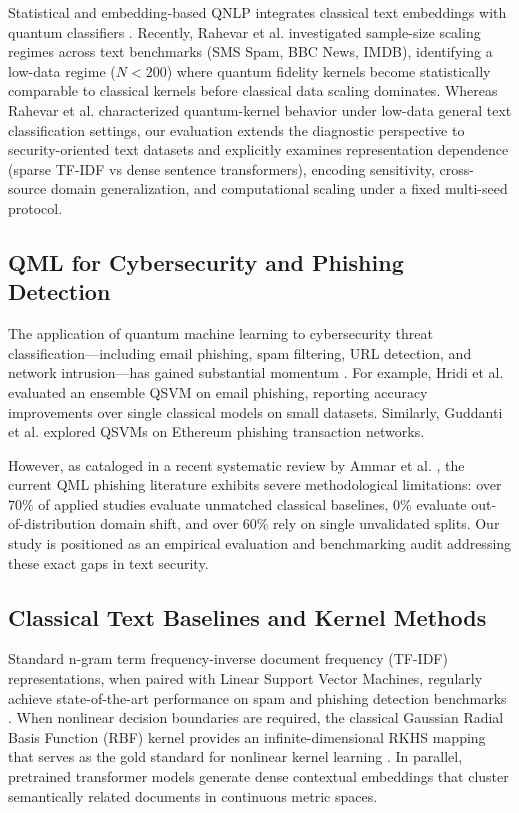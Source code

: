 \documentclass[10pt,twocolumn,letterpaper]{article}
\begin{document}
Statistical and embedding-based QNLP integrates classical text embeddings with quantum classifiers \cite{garg2024quantum,shukla2023quantum,disipio2021hybrid}. Recently, Rahevar et al. \cite{rahevar2026quantum} investigated sample-size scaling regimes across text benchmarks (SMS Spam, BBC News, IMDB), identifying a low-data regime ($N < 200$) where quantum fidelity kernels become statistically comparable to classical kernels before classical data scaling dominates. Whereas Rahevar et al. characterized quantum-kernel behavior under low-data general text classification settings, our evaluation extends the diagnostic perspective to security-oriented text datasets and explicitly examines representation dependence (sparse TF-IDF vs dense sentence transformers), encoding sensitivity, cross-source domain generalization, and computational scaling under a fixed multi-seed protocol.

\subsection{QML for Cybersecurity and Phishing Detection}
The application of quantum machine learning to cybersecurity threat classification---including email phishing, spam filtering, URL detection, and network intrusion---has gained substantial momentum \cite{sagingalieva2022quantum,ahmed2022quantum,shahriyar2025phishvqc,hridi2026batch,guddanti2026detecting}. For example, Hridi et al. \cite{hridi2026batch} evaluated an ensemble QSVM on email phishing, reporting accuracy improvements over single classical models on small datasets. Similarly, Guddanti et al. \cite{guddanti2026detecting} explored QSVMs on Ethereum phishing transaction networks. 

However, as cataloged in a recent systematic review by Ammar et al. \cite{ammar2026quantum}, the current QML phishing literature exhibits severe methodological limitations: over $70\%$ of applied studies evaluate unmatched classical baselines, $0\%$ evaluate out-of-distribution domain shift, and over $60\%$ rely on single unvalidated splits. Our study is positioned as an empirical evaluation and benchmarking audit addressing these exact gaps in text security.

\subsection{Classical Text Baselines and Kernel Methods}
Standard n-gram term frequency-inverse document frequency (TF-IDF) representations, when paired with Linear Support Vector Machines, regularly achieve state-of-the-art performance on spam and phishing detection benchmarks \cite{cortes1995support,verma2017detecting}. When nonlinear decision boundaries are required, the classical Gaussian Radial Basis Function (RBF) kernel provides an infinite-dimensional RKHS mapping that serves as the gold standard for nonlinear kernel learning \cite{cortes1995support,cortes2012algorithms}. In parallel, pretrained transformer models generate dense contextual embeddings that cluster semantically related documents in continuous metric spaces.
\end{document}
